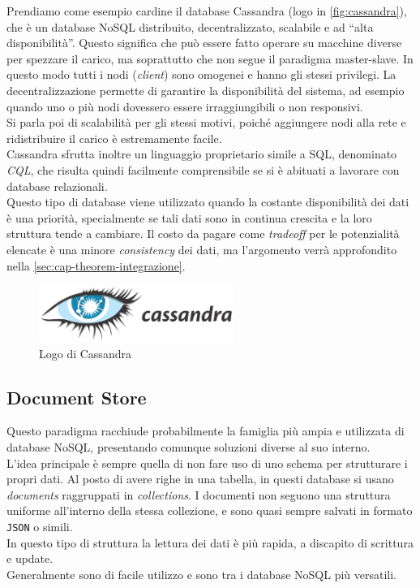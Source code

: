 \noindent Prendiamo come esempio cardine il database Cassandra (logo in \autoref{fig:cassandra}), che è un database NoSQL distribuito, decentralizzato, scalabile e ad ``alta disponibilità''\cite{site:udemycassandra}. Questo significa che può essere fatto operare su macchine diverse per spezzare il carico, ma soprattutto che non segue il paradigma \gls{master-slave}. In questo modo tutti i nodi (\textit{client}) sono omogenei e hanno gli stessi privilegi. La decentralizzazione permette di garantire la disponibilità del sistema, ad esempio quando uno o più nodi dovessero essere irraggiungibili o non responsivi.\\
Si parla poi di scalabilità per gli stessi motivi, poiché aggiungere nodi alla rete e ridistribuire il carico è estremamente facile.\\
Cassandra sfrutta inoltre un linguaggio proprietario simile a \gls{SQL}, denominato \textit{CQL}, che risulta quindi facilmente comprensibile se si è abituati a lavorare con database relazionali.\\

\noindent Questo tipo di database viene utilizzato quando la costante disponibilità dei dati è una priorità, specialmente se tali dati sono in continua crescita e la loro struttura tende a cambiare. Il costo da pagare come \textit{tradeoff} per le potenzialità elencate è una minore \textit{consistency} dei dati, ma l'argomento verrà approfondito nella \autoref{sec:cap-theorem-integrazione}.

\begin{figure}[htbp]
\begin{center}
\includegraphics[height=5em]{immagini/tecnologies-logos/Cassandra-Logo-h.png}
\caption{Logo di Cassandra}
\label{fig:cassandra}
\end{center}
\end{figure}

\subsection{Document Store}
Questo paradigma racchiude probabilmente la famiglia più ampia e utilizzata di database NoSQL, presentando comunque soluzioni diverse al suo interno\cite{site:mongoarticletypes}.\\
L'idea principale è sempre quella di non fare uso di uno schema per strutturare i propri dati. Al posto di avere righe in una tabella, in questi database si usano \textit{documents} raggruppati in \textit{collections}. I documenti non seguono una struttura uniforme all'interno della stessa collezione, e sono quasi sempre salvati in formato \texttt{JSON} o simili.\\
In questo tipo di struttura la lettura dei dati è più rapida, a discapito di scrittura e update.\\
Generalmente sono di facile utilizzo e sono tra i database NoSQL più versatili.\\

